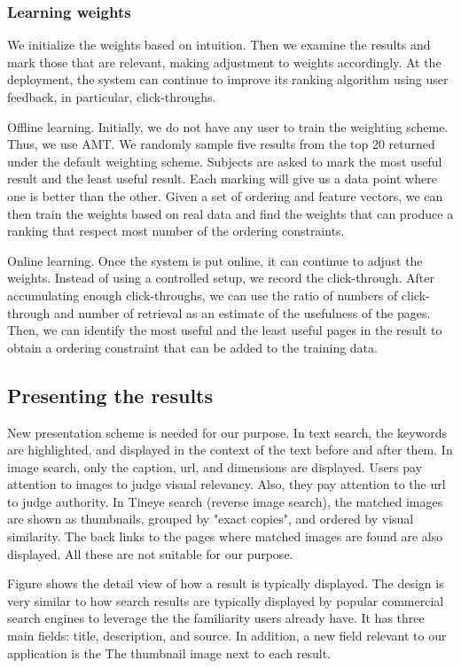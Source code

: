 \documentclass{www2010-submission}
\begin{document}
\subsubsection{Learning weights}

We initialize the weights based on intuition. Then we examine the
results and mark those that are relevant, making adjustment to
weights accordingly. At the deployment, the system can continue to
improve its ranking algorithm using user feedback, in particular,
click-throughs.

Offline learning. Initially, we do not have any user to train the
weighting scheme. Thus, we use AMT. We randomly sample five
results from the top 20 returned under the default weighting
scheme.  Subjects are asked to mark the most useful result and the
least useful result. Each marking will give us a data point where
one is better than the other. Given a set of ordering and feature
vectors, we can then train the weights based on real data and find
the weights that can produce a ranking that respect most number of
the ordering constraints.

Online learning. Once the system is put online, it can continue to
adjust the weights. Instead of using a controlled
setup, we record the click-through. After accumulating enough
click-throughs, we can use the ratio of numbers of click-through
and number of retrieval as an estimate of the usefulness of the
pages. Then, we can identify the most useful and the least useful
pages in the result to obtain a ordering constraint that can be
added to the training data.

\subsection{Presenting the results}

New presentation scheme is needed for our purpose. In text search,
the keywords are highlighted, and displayed in the context of the
text before and after them. In image search, only the caption,
url, and dimensions are displayed. Users pay attention to images
to judge visual relevancy. Also, they pay attention to the url to
judge authority. In Tineye search (reverse image search), the
matched images are shown as thumbnails, grouped by "exact copies",
and ordered by visual similarity. The back links to the pages
where matched images are found are also displayed. All these are
not suitable for our purpose.

Figure shows the detail view of how a result is typically
displayed. The design is very similar to how search results are
typically displayed by popular commercial search engines to
leverage the the familiarity users already have. It has three main
fields: title, description, and source. In
addition, a new field relevant to our application is the The
thumbnail image next to each result.
\end{document}
